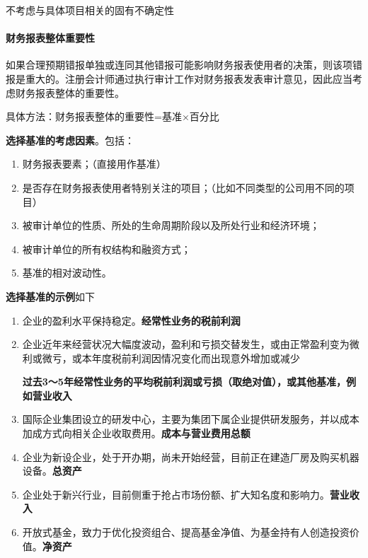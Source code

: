 \documentclass[UTF8,12pt]{ctexart}
\numberwithin{equation}{section} %
\numberwithin{figure}{section}
\numberwithin{table}{section}
\begin{document}
	不考虑与具体项目相关的固有不确定性
	
	\paragraph{财务报表整体重要性}
	如果合理预期错报单独或连同其他错报可能影响财务报表使用者的决策，则该项错报是重大的。注册会计师通过执行审计工作对财务报表发表审计意见，因此应当考虑财务报表整体的重要性。

	具体方法：财务报表整体的重要性=基准×百分比
	
	\textbf{选择基准的考虑因素}。包括：
	\begin{enumerate}
		\item 财务报表要素；（直接用作基准）
		
		\item 是否存在财务报表使用者特别关注的项目；（比如不同类型的公司用不同的项目）
		
		\item 被审计单位的性质、所处的生命周期阶段以及所处行业和经济环境；
		
		\item 被审计单位的所有权结构和融资方式；
		
		\item 基准的相对波动性。
	\end{enumerate}
	
	\textbf{选择基准的示例}如下
	\begin{enumerate}
		\item 企业的盈利水平保持稳定。\textbf{经常性业务的税前利润}
		
		\item 企业近年来经营状况大幅度波动，盈利和亏损交替发生，或由正常盈利变为微利或微亏，或本年度税前利润因情况变化而出现意外增加或减少
		
		\textbf{过去3～5年经常性业务的平均税前利润或亏损（取绝对值），或其他基准，例如营业收入}
		
		\item 国际企业集团设立的研发中心，主要为集团下属企业提供研发服务，并以成本加成方式向相关企业收取费用。\textbf{成本与营业费用总额}
		
		\item 企业为新设企业，处于开办期，尚未开始经营，目前正在建造厂房及购买机器设备。\textbf{总资产}
		
		\item 企业处于新兴行业，目前侧重于抢占市场份额、扩大知名度和影响力。\textbf{营业收入}
		
		\item 开放式基金，致力于优化投资组合、提高基金净值、为基金持有人创造投资价值。\textbf{净资产}
		
	\end{enumerate}
	
\end{document}
